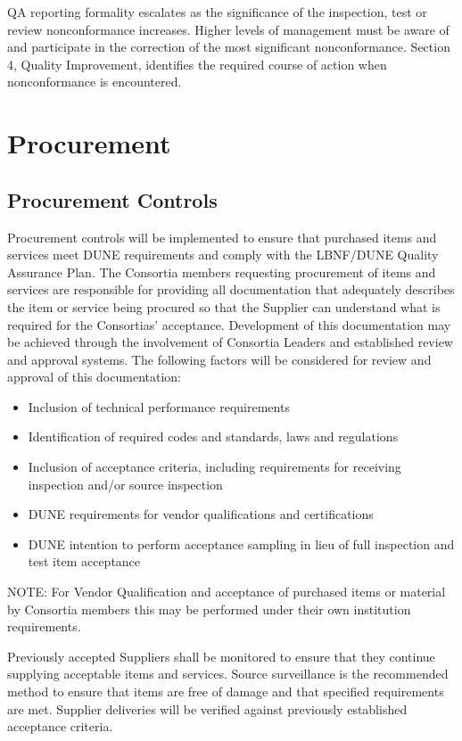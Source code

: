 QA reporting formality escalates as the significance of the
inspection, test or review nonconformance increases. Higher levels of
management must be aware of and participate in the correction of the
most significant nonconformance. Section 4, Quality Improvement,
identifies the required course of action when nonconformance is
encountered.

\section{Procurement}

\subsection{Procurement Controls}

Procurement controls will be implemented to ensure that purchased
items and services meet DUNE requirements and comply with the
LBNF/DUNE Quality Assurance Plan.  The Consortia members requesting
procurement of items and services are responsible for providing all
documentation that adequately describes the item or service being
procured so that the Supplier can understand what is required for the
Consortias’ acceptance. Development of this documentation may be
achieved through the involvement of Consortia Leaders and established
review and approval systems. The following factors will be considered
for review and approval of this documentation:
\begin{itemize}
 \item Inclusion of technical performance requirements
 \item Identification of required codes and standards, laws and regulations
 \item Inclusion of acceptance criteria, including requirements for receiving inspection and/or source inspection
 \item DUNE requirements for vendor qualifications and certifications
 \item DUNE intention to perform acceptance sampling in lieu of full inspection and test item acceptance
\end{itemize}
NOTE: For Vendor Qualification and acceptance of purchased items or
material by Consortia members this may be performed under their own
institution requirements.

Previously accepted Suppliers shall be monitored to ensure that they
continue supplying acceptable items and services. Source surveillance
is the recommended method to ensure that items are free of damage and
that specified requirements are met. Supplier deliveries will be
verified against previously established acceptance criteria.

